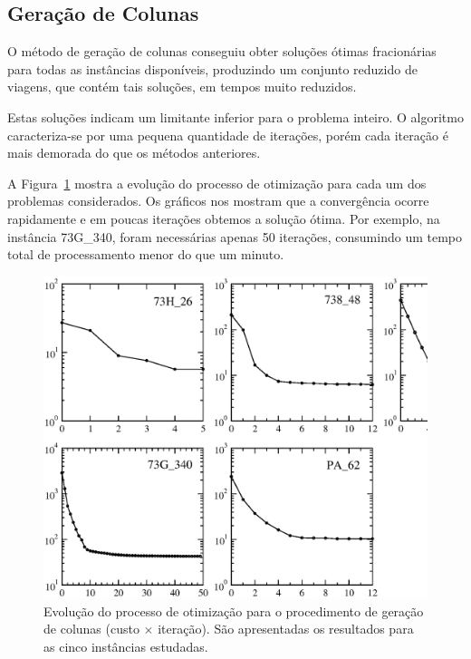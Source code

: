
\subsection{Geração de Colunas}
\label{sec:resultados_cg}

O método de geração de colunas conseguiu obter soluções ótimas fracionárias para todas as instâncias
disponíveis, produzindo um conjunto reduzido de viagens, que contém tais soluções, em tempos muito
reduzidos. 

Estas soluções indicam um limitante inferior para o problema inteiro. O algoritmo
caracteriza-se por uma pequena quantidade de iterações, porém cada iteração é mais demorada do que
os métodos anteriores.

A Figura~\ref{fig:cg_results} mostra a evolução do processo de otimização para cada um dos problemas
considerados. Os gráficos nos mostram que a convergência ocorre rapidamente e em poucas
iterações obtemos a solução ótima. Por exemplo, na instância 73G\_340, foram necessárias apenas
50 iterações, consumindo um tempo total de processamento menor do que um minuto. 

\begin{figure}[htbp]
	\begin{center}
		\includegraphics[scale=0.5]{fig/cg_results.eps}
		\caption{Evolução do processo de otimização para o procedimento de geração de colunas (custo 
		$\times$ iteração). São apresentadas os resultados para as cinco instâncias estudadas.}
		\label{fig:cg_results}
	\end{center}
\end{figure}

